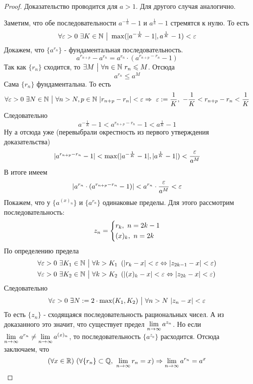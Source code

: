     \begin{proof}
        Доказательство проводится для $a > 1$. Для другого случая аналогично.
        
        Заметим, что обе последовательности $a^{-\frac{1}{n}} - 1$ и $a^{\frac{1}{n}} - 1$ стремятся к нулю. То есть
        \[
            \forall \varepsilon > 0\ \exists K \in \mathbb{N} \ \big|\  \max(|a^{-\frac{1}{K}} - 1|, a^{\frac{1}{K}} - 1) < \varepsilon
        \]
        Докажем, что $\{a^{r_n}\}$ - фундаментальная последовательность.
        \[
            a^{r_{n + p}} - a^{r_n} = a^{r_n} \cdot (a^{r_{n + p} - r_n} - 1)
        \]
        Так как $\{r_n\}$ сходится, то $\exists M \ \big|\  \forall n \in \mathbb{N}\ r_n \leqslant M$. Отсюда
        \[
            a^{r_n} \le a^M
        \]
        Сама $\{r_n\}$ фундаментальна. То есть
        \[
            \forall \varepsilon > 0\ \exists N \in \mathbb{N} \ \big|\  \forall n > N, p \in \mathbb{N}\ |r_{n + p} - r_n| < \varepsilon \Rightarrow\ \varepsilon := \frac{1}{K},\ -\frac{1}{K} < r_{n + p} - r_n < \frac{1}{K}
        \]
        Следовательно
        \[
            a^{-\frac{1}{K}} - 1 < a^{r_{n + p} - r_n} - 1 < a^{\frac{1}{K}} - 1
        \]
        Ну а отсюда уже (перевыбрали окрестность из первого утверждения доказательства)
        \[
            |a^{r_{n + p} - r_n} - 1| < \max(|a^{-\frac{1}{K}} - 1|, |a^{\frac{1}{K}} - 1|) < \frac{\varepsilon}{a^M}
        \]
        В итоге имеем
        \[
            |a^{r_n} \cdot (a^{r_{n + p} - r_n} - 1)| < a^{r_n} \cdot \frac{\varepsilon}{a^M} < \varepsilon
        \]
        Покажем, что у $\{a^{(x)_n}\}$ и $\{a^{r_n}\}$ одинаковые пределы. Для этого рассмотрим последовательность:
        \[
            z_n = \left\{\begin{aligned}
                &{r_k,\ n = 2k - 1}
                \\
                &{(x)_k,\ n = 2k}
            \end{aligned}\right.
        \]
        По определению предела
        \begin{align*}
            &\forall \varepsilon > 0\ \exists K_1 \in \mathbb{N} \ \big|\  \forall k > K_1\ \left(|r_k - x| < \varepsilon \Leftrightarrow |z_{2k - 1} - x| < \varepsilon\right)
            \\
            &\forall \varepsilon > 0\ \exists K_2 \in \mathbb{N} \ \big|\  \forall k > K_2\ \left(|(x)_k - x| < \varepsilon \Leftrightarrow |z_{2k} - x| < \varepsilon\right)
        \end{align*}
        Следовательно
        \[
            \forall \varepsilon > 0\ \exists N := 2 \cdot \max(K_1, K_2) \ \big|\  \forall n > N\ |z_n - x| < \varepsilon
        \]
        То есть $\{z_n\}$ - сходящаяся последовательность рациональных чисел. А из доказанного это значит, что существует предел $\lim\limits_{n \to \infty} a^{z_n}$. Но если $\lim\limits_{n \to \infty} a^{r_n} \neq \lim\limits_{n \to \infty} a^{(x)_n}$, то последовательность $\{a^{z_n}\}$ расходится. Отсюда заключаем, что
        \[
            (\forall x \in \mathbb{R})\ (\forall \{r_n\} \subset \mathbb{Q},\ \lim\limits_{n \to \infty} r_n = x) \Rightarrow \lim\limits_{n \to \infty} a^{r_n} = a^x
        \]
    \end{proof}

